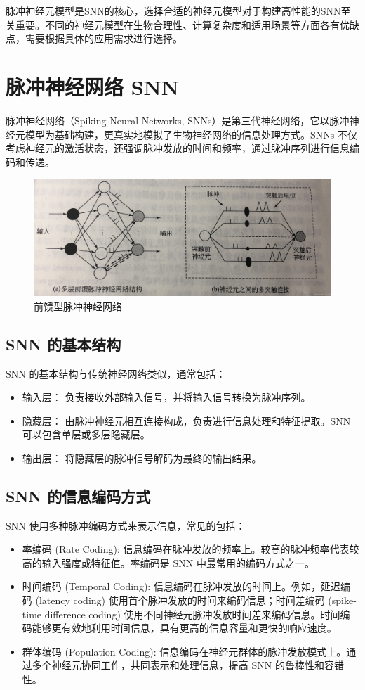 \documentclass[12pt, a4paper, oneside]{ctexart}
\numberwithin{equation}{section}  %
\begin{document}
脉冲神经元模型是SNN的核心，选择合适的神经元模型对于构建高性能的SNN至关重要。不同的神经元模型在生物合理性、计算复杂度和适用场景等方面各有优缺点，需要根据具体的应用需求进行选择。

\section{脉冲神经网络 SNN}
脉冲神经网络（Spiking Neural Networks, SNNs）是第三代神经网络，它以脉冲神经元模型为基础构建，更真实地模拟了生物神经网络的信息处理方式。SNNs 不仅考虑神经元的激活状态，还强调脉冲发放的时间和频率，通过脉冲序列进行信息编码和传递。
\begin{figure}[htbp]
    \centering
    \includegraphics[width=\linewidth]{3.jpeg}
    \caption{前馈型脉冲神经网络}
\end{figure}
\subsection{SNN 的基本结构}
SNN 的基本结构与传统神经网络类似，通常包括：
\begin{itemize}
    \item 输入层： 负责接收外部输入信号，并将输入信号转换为脉冲序列。
    \item 隐藏层： 由脉冲神经元相互连接构成，负责进行信息处理和特征提取。SNN 可以包含单层或多层隐藏层。
    \item 输出层： 将隐藏层的脉冲信号解码为最终的输出结果。
\end{itemize}
\subsection{SNN 的信息编码方式}
SNN 使用多种脉冲编码方式来表示信息，常见的包括：
\begin{itemize}
    \item 率编码 (Rate Coding): 信息编码在脉冲发放的频率上。较高的脉冲频率代表较高的输入强度或特征值。率编码是 SNN 中最常用的编码方式之一。
    \item 时间编码 (Temporal Coding): 信息编码在脉冲发放的时间上。例如，延迟编码 (latency coding) 使用首个脉冲发放的时间来编码信息；时间差编码 (spike-time difference coding) 使用不同神经元脉冲发放时间差来编码信息。时间编码能够更有效地利用时间信息，具有更高的信息容量和更快的响应速度。
    \item 群体编码 (Population Coding): 信息编码在神经元群体的脉冲发放模式上。通过多个神经元协同工作，共同表示和处理信息，提高 SNN 的鲁棒性和容错性。
\end{itemize}
\end{document}
